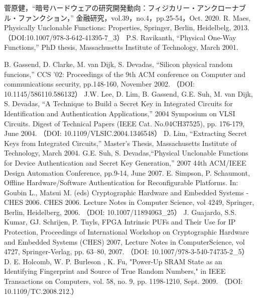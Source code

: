 \documentclass[technicalreport]{ieicej} %
\begin{document}
%
%
\begin{thebibliography}{99}%
  菅原健，“暗号ハードウェアの研究開発動向：フィジカリー・アンクローナブル・ファンクション，”
  金融研究，vol.39，no.4，pp.25-54，Oct. 2020.
  R. Maes, Physically Unclonable Functions: Properties, Springer, Berlin, Heidelbelg, 2013.
  （DOI:10.1007/978-3-642-41395-7\_3）
  P.S. Ravikanth, “Physical One-Way Functions,” PhD thesis,
  Massachusetts Institute of Technology, March 2001.

  B. Gassend, D. Clarke, M. van Dijk, S. Devadas, “Silicon physical random funcions,”
  CCS '02: Proceedings of the 9th ACM conference on Computer and communications security,
  pp.148-160, November 2002. （DOI: 10.1145/586110.586132）
  J.W. Lee, D. Lim, B. Gassend, G.E. Suh, M. van Dijk, S. Devadas,
  “A Technique to Build a Secret Key in Integrated Circuits for Identification and Authentication Applications,”
  2004 Symposium on VLSI Circuits. Digest of Technical Papers (IEEE Cat. No.04CH37525),
  pp. 176-179, June 2004. （DOI: 10.1109/VLSIC.2004.1346548）
  D. Lim, “Extracting Secret Keys from Integrated Circuits,” Master's Thesis,
  Massachusetts Institute of Technology, March 2004.
  G.E. Suh, S. Devadas,“Physical Unclonable Functions for Device Authentication and Secret Key Generation,”
  2007 44th ACM/IEEE Design Automation Conference, pp.9-14, June 2007.
  E. Simpson, P. Schaumont, Offline Hardware/Software Authentication for Reconfigurable Platforms.
  In: Goubin L., Matsui M. (eds) Cryptographic Hardware and Embedded Systems - CHES 2006.
  CHES 2006. Lecture Notes in Computer Science, vol 4249, Springer, Berlin, Heidelberg, 2006.
  （DOI: 10.1007/11894063\_25）
  J. Guajardo, S.S. Kumar, GJ. Schrijen, P. Tuyls, FPGA Intrinsic PUFs and Their Use for IP Protection,
  Proceedings of International Workshop on Cryptographic Hardware and Embedded Systems (CHES) 2007,
  Lecture Notes in ComputerScience, vol 4727, Springer-Verlag, pp. 63–80, 2007.
  （DOI: 10.1007/978-3-540-74735-2\_5）
  D. E. Holcomb, W. P. Burleson , K. Fu,
  "Power-Up SRAM State as an Identifying Fingerprint and Source of True Random Numbers,"
  in IEEE Transactions on Computers, vol. 58, no. 9, pp. 1198-1210, Sept. 2009.
  （DOI: 10.1109/TC.2008.212.）


\end{thebibliography}
\end{document}
